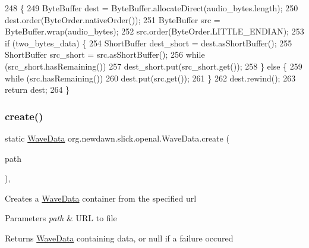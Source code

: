 \begin{DoxyCode}
248                                                                                             \{
249         ByteBuffer dest = ByteBuffer.allocateDirect(audio\_bytes.length);
250         dest.order(ByteOrder.nativeOrder());
251         ByteBuffer src = ByteBuffer.wrap(audio\_bytes);
252         src.order(ByteOrder.LITTLE\_ENDIAN);
253         \textcolor{keywordflow}{if} (two\_bytes\_data) \{
254             ShortBuffer dest\_short = dest.asShortBuffer();
255             ShortBuffer src\_short = src.asShortBuffer();
256             \textcolor{keywordflow}{while} (src\_short.hasRemaining())
257                 dest\_short.put(src\_short.get());
258         \} \textcolor{keywordflow}{else} \{
259             \textcolor{keywordflow}{while} (src.hasRemaining())
260                 dest.put(src.get());
261         \}
262         dest.rewind();
263         \textcolor{keywordflow}{return} dest;
264     \}
\end{DoxyCode}
\mbox{\label{classorg_1_1newdawn_1_1slick_1_1openal_1_1_wave_data_a8848866627bc92b5a94a59b800e8627c}} 
\subsubsection{\texorpdfstring{create()}{create()}\hspace{0.1cm}{\footnotesize\ttfamily [1/6]}}
{\footnotesize\ttfamily static \mbox{\hyperlink{classorg_1_1newdawn_1_1slick_1_1openal_1_1_wave_data}{Wave\+Data}} org.\+newdawn.\+slick.\+openal.\+Wave\+Data.\+create (\begin{DoxyParamCaption}\item[{U\+RL}]{path }\end{DoxyParamCaption})\hspace{0.3cm}{\ttfamily [inline]}, {\ttfamily [static]}}

Creates a \mbox{\hyperlink{classorg_1_1newdawn_1_1slick_1_1openal_1_1_wave_data}{Wave\+Data}} container from the specified url


\begin{DoxyParams}{Parameters}
{\em path} & U\+RL to file \\
\hline
\end{DoxyParams}
\begin{DoxyReturn}{Returns}
\mbox{\hyperlink{classorg_1_1newdawn_1_1slick_1_1openal_1_1_wave_data}{Wave\+Data}} containing data, or null if a failure occured 
\end{DoxyReturn}

